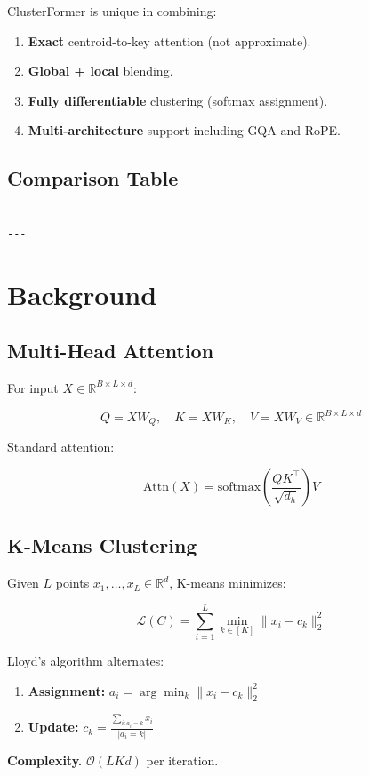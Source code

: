 ClusterFormer is unique in combining:
\begin{enumerate}
\item \textbf{Exact} centroid-to-key attention (not approximate).
\item \textbf{Global + local} blending.
\item \textbf{Fully differentiable} clustering (softmax assignment).
\item \textbf{Multi-architecture} support including GQA and RoPE.

\end{enumerate}
\subsection{Comparison Table}

\begin{lstlisting}

---
\end{lstlisting}

\section{Background}

\subsection{Multi-Head Attention}

For input $X \in \mathbb{R}^{B \times L \times d}$:

\[
Q = X W_Q, \quad K = X W_K, \quad V = X W_V \in \mathbb{R}^{B \times L \times d}
\]

Standard attention:

\[
\text{Attn}(X) = \text{softmax}\!\left(\frac{Q K^\top}{\sqrt{d_h}}\right) V
\]

\subsection{K-Means Clustering}

Given $L$ points $x_1, \dots, x_L \in \mathbb{R}^d$, K-means minimizes:

\[
\mathcal{L}(C) = \sum_{i=1}^{L} \min_{k \in [K]} \|x_i - c_k\|_2^2
\]

Lloyd's algorithm alternates:

\begin{enumerate}
\item \textbf{Assignment:} $a_i = \arg\min_k \|x_i - c_k\|_2^2$
\item \textbf{Update:} $c_k = \frac{\sum_{i: a_i = k} x_i}{|a_i = k|}$

\end{enumerate}
\textbf{Complexity.} $\mathcal{O}(L K d)$ per iteration.

